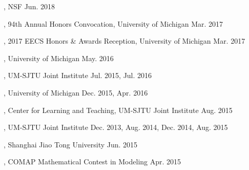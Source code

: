 
\begin{cvhonors}
  \cvhonor
    {, NSF} %
    {Jun. 2018} %
\end{cvhonors}

\begin{cvhonors}
  \cvhonor
    {, 94th Annual Honors Convocation, University of Michigan} %
    {Mar. 2017} %
  \end{cvhonors}

\begin{cvhonors}
  \cvhonor
    {, 2017 EECS Honors \& Awards Reception, University of Michigan} %
    {Mar. 2017} %
  \end{cvhonors}

\begin{cvhonors}
  \cvhonor
    {, University of Michigan} %
    {May. 2016} %
  \end{cvhonors}

\begin{cvhonors}
  \cvhonor
    {, UM-SJTU Joint Institute} %
    {Jul. 2015, Jul. 2016} %
  \end{cvhonors}

\begin{cvhonors}    
  \cvhonor
    {, University of Michigan} %
    {Dec. 2015, Apr. 2016} %
  \end{cvhonors}

\begin{cvhonors}
    \cvhonor
    {, Center for Learning and Teaching, UM-SJTU Joint Institute} %
    {Aug. 2015} %
  \end{cvhonors}

\begin{cvhonors}  
  \cvhonor
    {, UM-SJTU Joint Institute} %
    {Dec. 2013, Aug. 2014, Dec. 2014, Aug. 2015} %
  \end{cvhonors}

\begin{cvhonors}
  \cvhonor
    {, Shanghai Jiao Tong University} %
    {Jun. 2015} %
  \end{cvhonors}
    
\begin{cvhonors}
  \cvhonor
    {, COMAP Mathematical Contest in Modeling} %
    {Apr. 2015} %
  \end{cvhonors}


